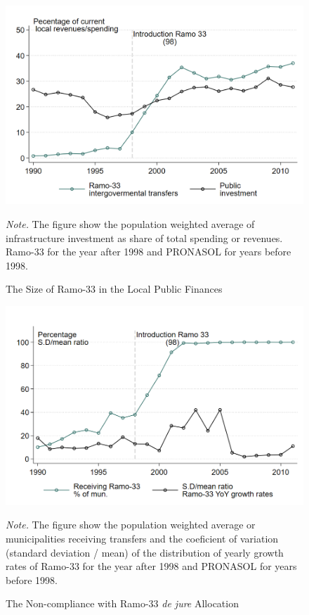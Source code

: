 \documentclass[dv_diss_main.tex]{subfiles}
\begin{document}
\newpage

\begin{figure}[h]
    \begin{center}
			\includegraphics[width=0.8\linewidth]{figures/Panel_b_fig_sizable.png}
            \caption{The Size of Ramo-33 in the Local Public Finances}\label{fig:icbudgsize33}
    \end{center}
	\vspace{0.5em}
	\begin{figurenotes}
    \footnotesize	
	\textit{Note. }The figure show the population weighted average of infrastructure investment as share of total  spending or revenues. Ramo-33 for the year after 1998 and PRONASOL for years before 1998.
	\end{figurenotes}
\end{figure}

\newpage

\begin{figure}[h]
	\begin{center}
			\includegraphics[width=0.8\linewidth]{figures/Pol_econ.png}
			\caption{The Non-compliance with Ramo-33 \textit{de jure} Allocation}\label{fig:pol}
	\end{center}
	\vspace{0.5em}
	\begin{figurenotes}
    \footnotesize	
	\textit{Note. }The figure show the population weighted average or municipalities receiving transfers and the coeficient of variation (standard deviation / mean) of the distribution of yearly growth rates of Ramo-33 for the year after 1998 and PRONASOL for years before 1998.
	\end{figurenotes}
\end{figure}
\end{document}
